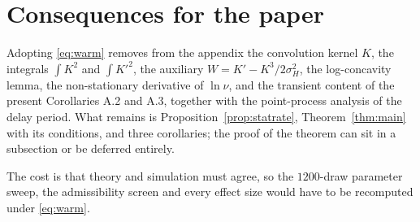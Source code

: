 \documentclass[11pt,a4paper]{article}
\theoremstyle{remark}\newtheorem{remark}[proposition]{Remark}
\begin{document}
\section{Consequences for the paper}

Adopting \eqref{eq:warm} removes from the appendix the convolution kernel $K$, the
integrals $\int K^{2}$ and $\int K'^{2}$, the auxiliary $W=K'-K^{3}/2\sigma_H^{2}$,
the log-concavity lemma, the non-stationary derivative of $\ln\nu$, and the transient
content of the present Corollaries A.2 and A.3, together with the point-process
analysis of the delay period. What remains is Proposition~\ref{prop:statrate},
Theorem~\ref{thm:main} with its conditions, and three corollaries; the proof of the
theorem can sit in a subsection or be deferred entirely.

The cost is that theory and simulation must agree, so the $1200$-draw parameter sweep,
the admissibility screen and every effect size would have to be recomputed under
\eqref{eq:warm}.
\end{document}
